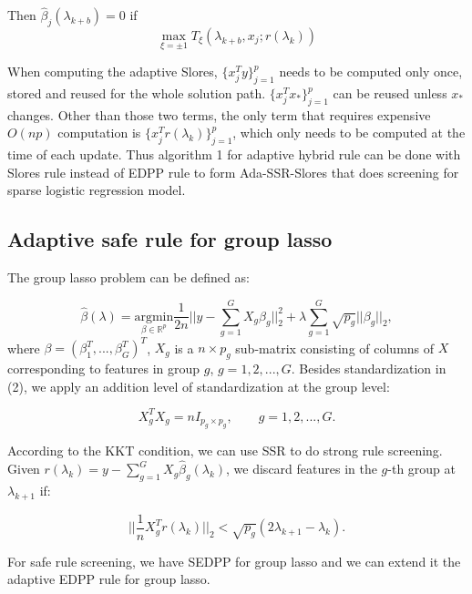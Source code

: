 \begin{theorem}
Then $\hat{\beta}_j(\lambda_{k+b})=0$ if
        \begin{equation}
            \max_{\xi=\pm1} T_\xi(\lambda_{k+b},x_j;r(\lambda_k))
        \end{equation}
\end{theorem}

When computing the adaptive Slores, $\{x_j^Ty\}_{j=1}^p$ needs to be computed only once, stored and reused for the whole solution path. $\{x_j^Tx_*\}_{j=1}^p$ can be reused unless $x_*$ changes. Other than those two terms, the only term that requires expensive $O(np)$ computation is $\{x_j^Tr(\lambda_k)\}_{j=1}^p$, which only needs to be computed at the time of each update. Thus algorithm 1 for adaptive hybrid rule can be done with Slores rule instead of EDPP rule to form Ada-SSR-Slores that does screening for sparse logistic regression model.

\subsection{Adaptive safe rule for group lasso}

The group lasso problem \citep{yuan2006model} can be defined as:

\begin{equation}
    \hat{\beta}(\lambda) = \underset{\beta\in \mathbb{R}^p}{\mathrm{argmin}}\frac{1}{2n}\bigg|\bigg|y-\sum_{g=1}^GX_g\beta_g\bigg|\bigg|_2^2+\lambda\sum_{g=1}^G\sqrt{p_g}||\beta_g||_2,
\end{equation}
where $\beta=(\beta_1^T,...,\beta_G^T)^T$, $X_g$ is a $n\times p_g$ sub-matrix consisting of columns of $X$ corresponding to features in group $g$, $g=1,2,...,G$. Besides standardization in (2), we apply an addition level of standardization at the group level\citep{breheny2015group}:

\begin{equation}
    X_g^TX_g=nI_{p_g\times p_g},\qquad g=1,2,...,G.
\end{equation}

According to the KKT condition, we can use SSR to do strong rule screening. Given $r(\lambda_k)=y-\sum_{g=1}^GX_g\hat{\beta}_g(\lambda_k)$, we discard features in the $g$-th group at $\lambda_{k+1}$ if:

\begin{equation}
    \bigg|\bigg|\frac{1}{n}X_g^Tr(\lambda_k)\bigg|\bigg|_2<\sqrt{p_g}(2\lambda_{k+1}-\lambda_k).
\end{equation}

For safe rule screening, we have SEDPP for group lasso\citep{wang2013lasso} and we can extend it the adaptive EDPP rule for group lasso.

